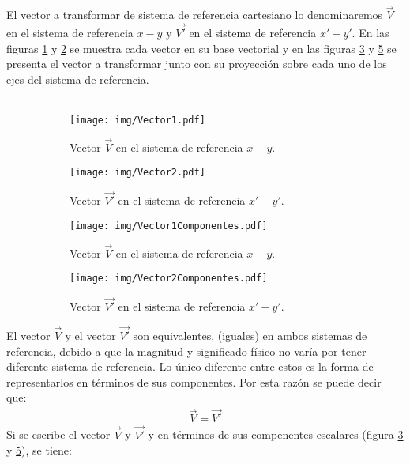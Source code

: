 \documentclass[12pt,letterpaper, twoside, openany]{article}
\begin{document}
%
%
El vector a transformar de sistema de referencia cartesiano lo denominaremos $\overset{\rightarrow}{V}$ en el sistema de referencia $x-y$ y $\overset{\rightarrow}{V'}$ en el sistema de referencia $x'-y'$. En las figuras \ref{vector1} y  \ref{vector2} se muestra cada vector en su base vectorial y en las  figuras \ref{vector1comp} y \ref{vector2comp} se presenta el vector a transformar junto con su proyección sobre cada uno de los ejes del sistema de referencia.\\\\
%
%
\begin{figure}[H]
	\centering
	\begin{subfigure}[l]{0.45\textwidth}
		\texttt{[image: img/Vector1.pdf]}
		\caption{Vector $\overset{\rightarrow}{V}$ en el sistema de referencia $x-y$.}
		\label{vector1}
	\end{subfigure}
	\hspace{.5 cm}
	\begin{subfigure}[r]{0.45\textwidth}
		\texttt{[image: img/Vector2.pdf]}
		\caption{Vector $\overset{\rightarrow}{V'}$ en el sistema de referencia $x'-y'$.}
		\label{vector2}
	\end{subfigure}
	\hspace{.5 cm}
%


	\begin{subfigure}[l]{0.450\textwidth}
		\texttt{[image: img/Vector1Componentes.pdf]}
		\caption{Vector $\overset{\rightarrow}{V}$ en el sistema de referencia $x-y$.}
		\label{vector1comp}
	\end{subfigure}
	\hspace{.5 cm}
	\begin{subfigure}[r]{0.450\textwidth}
		\texttt{[image: img/Vector2Componentes.pdf]}
		\caption{Vector $\overset{\rightarrow}{V'}$ en el sistema de referencia $x'-y'$.}
		\label{vector2comp}
	\end{subfigure}	
	\caption{}
\end{figure}
%
%
El vector $\overset{\rightarrow}{V}$ y el vector $\overset{\rightarrow}{V'}$ son equivalentes, (iguales) en ambos sistemas de referencia, debido a que la magnitud y significado físico no varía por tener diferente sistema de referencia. Lo único diferente entre estos es la forma de representarlos en términos de sus componentes. Por esta razón se puede decir que:
%
\begin{align}
	\overset{\rightarrow}{V} = \overset{\rightarrow}{V'}
	\label{uno}
\end{align}
%
Si se escribe el vector $\overset{\rightarrow}{V}$  y  $\overset{\rightarrow}{V'}$ y en términos de sus compenentes escalares (figura \ref{vector1comp} y \ref{vector2comp}), se tiene: 
\end{document}
